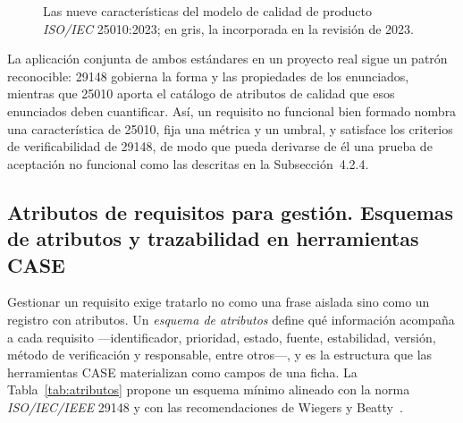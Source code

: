 \documentclass[11pt,a4paper,oneside]{report}
\begin{document}
	\begin{figure}[htbp]
		\centering
		\caption{Las nueve caracter\'isticas del modelo de calidad de producto \textit{ISO/IEC} 25010:2023; en gris, la incorporada en la revisi\'on de 2023.}
		\label{fig:iso25010}
	\end{figure}
	
	La aplicaci\'on conjunta de ambos est\'andares en un proyecto real sigue un patr\'on reconocible: 29148 gobierna la forma y las propiedades de los enunciados, mientras que 25010 aporta el cat\'alogo de atributos de calidad que esos enunciados deben cuantificar. As\'i, un requisito no funcional bien formado nombra una caracter\'istica de 25010, fija una m\'etrica y un umbral, y satisface los criterios de verificabilidad de 29148, de modo que pueda derivarse de \'el una prueba de aceptaci\'on no funcional como las descritas en la Subsecci\'on~4.2.4.
	
	\subsection{Atributos de requisitos para gesti\'on. Esquemas de atributos y trazabilidad en herramientas CASE}
	
	Gestionar un requisito exige tratarlo no como una frase aislada sino como un registro con atributos. Un \textit{esquema de atributos} define qu\'e informaci\'on acompa\~na a cada requisito ---identificador, prioridad, estado, fuente, estabilidad, versi\'on, m\'etodo de verificaci\'on y responsable, entre otros---, y es la estructura que las herramientas CASE materializan como campos de una ficha. La Tabla~\ref{tab:atributos} propone un esquema m\'inimo alineado con la norma \textit{ISO/IEC/IEEE} 29148 \citep{iso29148_2018} y con las recomendaciones de Wiegers y Beatty~\citep{wiegers_beatty_2013}.
	
\end{document}
